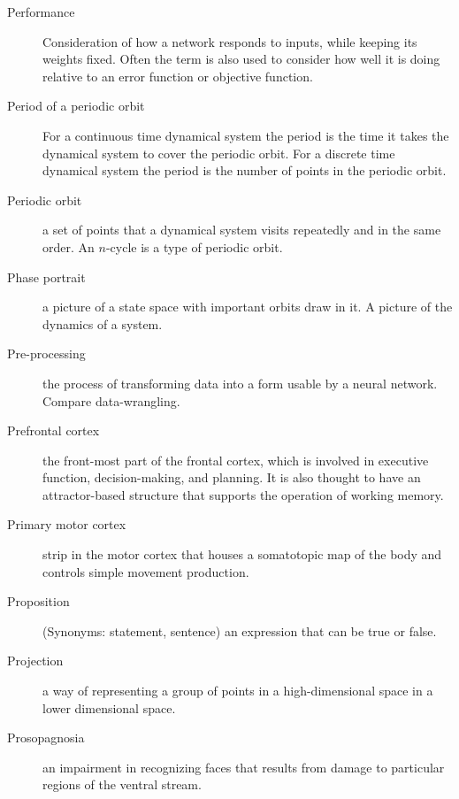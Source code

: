 \begin{description}
\item[Performance] Consideration of how a network responds to inputs, while keeping its weights fixed.  Often the term is also used to consider how well it is doing relative to an error function or objective function.

\item[Period of a periodic orbit] For a continuous time dynamical system the period is the time it takes the dynamical system to cover the periodic orbit. For a discrete time dynamical system the period is the number of points in the periodic orbit.

\item[Periodic orbit] a set of points that a dynamical system visits repeatedly and in the same order. An $n$-cycle is a type of periodic orbit.

\item[Phase portrait] a picture of a state space with important orbits draw in it. A picture of the dynamics of a system.

\item[Pre-processing] the process of transforming data into a form usable by a neural network. Compare data-wrangling.


\item[Prefrontal cortex] the front-most part of the frontal cortex, which is involved in executive function, decision-making, and planning. It is also thought to have an attractor-based structure that supports the operation of working memory.

\item[Primary motor cortex] strip in the motor cortex that houses a somatotopic map of the body and controls simple movement production. 

\item[Proposition]  (Synonyms: statement, sentence) an expression that can be true or false.

\item[Projection] a way of representing a group of points in a high-dimensional space in a lower dimensional space.

\item[Prosopagnosia] an impairment in recognizing faces that results from damage to particular regions of the ventral stream.



\end{description}
